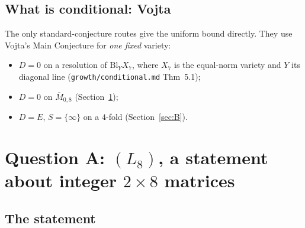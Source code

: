 \documentclass[11pt]{article}
\newcommand{\Mbar}{\overline M_{0,8}}
\newcommand{\rec}[1]{\texttt{#1}}
\begin{document}
\subsection{What is conditional: Vojta}

The only standard-conjecture routes give the uniform bound directly.  They use
Vojta's Main Conjecture for \emph{one fixed} variety:
\begin{itemize}[leftmargin=2em]
  \item \(D=0\) on a resolution of \(\mathrm{Bl}_YX_7\), where \(X_7\) is the
    equal-norm variety and \(Y\) its diagonal line
    (\rec{growth/conditional.md} Thm~5.1);
  \item \(D=0\) on \(\Mbar\) (Section~\ref{sec:A});
  \item \(D=E\), \(S=\{\infty\}\) on a \(4\)-fold (Section~\ref{sec:B}).
\end{itemize}

\section{Question A: \texorpdfstring{\((L_8)\)}{(L8)}, a statement about integer \texorpdfstring{\(2\times8\)}{2x8} matrices}\label{sec:A}

\subsection{The statement}
\end{document}
